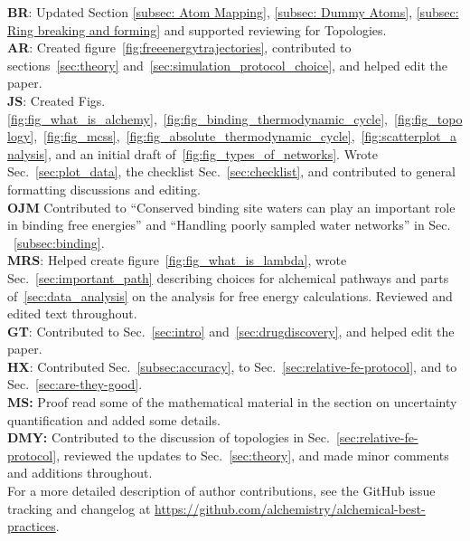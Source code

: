 \documentclass[9pt,bestpractices]{livecoms}
\newcommand{\githubrepository}{\url{https://github.com/alchemistry/alchemical-best-practices}} %
\begin{document}
\textbf{BR}: Updated Section \ref{subsec: Atom Mapping}, \ref{subsec: Dummy Atoms}, \ref{subsec: Ring breaking and forming} and supported reviewing for Topologies.\\
\textbf{AR}: Created figure~\ref{fig:freeenergytrajectories}, contributed to sections~\ref{sec:theory} and~\ref{sec:simulation_protocol_choice}, and helped edit the paper.\\
\textbf{JS}: Created Figs.~ \ref{fig:fig_what_is_alchemy},~\ref{fig:fig_binding_thermodynamic_cycle},~\ref{fig:fig_topology},~\ref{fig:fig_mcss},~\ref{fig:fig_absolute_thermodynamic_cycle},~\ref{fig:scatterplot_analysis}, and an initial draft of~\ref{fig:fig_types_of_networks}. Wrote Sec.~\ref{sec:plot_data}, the checklist Sec.~\ref{sec:checklist}, and contributed to general formatting discussions and editing.\\
\textbf{OJM} Contributed to ``Conserved binding site waters can play an important role in binding free energies'' and ``Handling poorly sampled water networks'' in Sec. ~\ref{subsec:binding}.\\
\textbf{MRS}: Helped create figure~\ref{fig:fig_what_is_lambda}, wrote Sec.~\ref{sec:important_path} describing choices for alchemical pathways and parts of~\ref{sec:data_analysis} on the analysis for free energy calculations. Reviewed and edited text throughout.\\
\textbf{GT}: Contributed to Sec.~\ref{sec:intro} and~\ref{sec:drugdiscovery}, and helped edit the paper.\\
\textbf{HX}: Contributed Sec.~\ref{subsec:accuracy}, to Sec.~\ref{sec:relative-fe-protocol}, and to Sec.~\ref{sec:are-they-good}.\\
\textbf{MS:} Proof read some of the mathematical material in the section on uncertainty quantification and added some details. \\
\textbf{DMY:} Contributed to the discussion of topologies in Sec.~\ref{sec:relative-fe-protocol}, reviewed the updates to Sec.~\ref{sec:theory}, and made minor comments and additions throughout. \\
For a more detailed description of author contributions,
see the GitHub issue tracking and changelog at \githubrepository.
\end{document}
